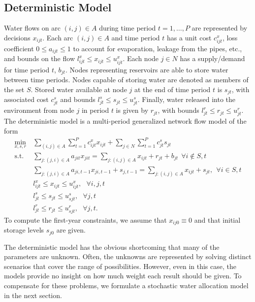 \documentclass[opre,nonblindrev]{informs3} %
\newcommand{\st}{\mbox{s.t.}}
\begin{document}
\subsection{Deterministic Model}

Water flows on arc $(i,j) \in A$ during time period $t = 1, \dots, P$ are represented by decisions $x_{ijt}$.
Each arc $(i,j) \in A$ and time period $t$ has a unit cost $c_{ijt}^x$, loss coefficient $0 \leq a_{ijt} \leq 1$ to account for evaporation, leakage from the pipes, etc., and bounds on the flow $l_{ijt}^x \leq x_{ijt} \leq u_{ijt}^x$.
Each node $j \in N$ has a supply/demand for time period $t$, $b_{jt}$.
Nodes representing reservoirs are able to store water between time periods.
Nodes capable of storing water are denoted as members of the set $S$.
Stored water available at node $j$ at the end of time period $t$ is $s_{jt}$, with associated cost $c_{jt}^s$ and bounds $l_{jt}^s \leq s_{jt} \leq u_{jt}^s$.
Finally, water released into the environment from node $j$ in period $t$ is given by $r_{jt}$, with bounds $l_{jt}^r \leq r_{jt} \leq u_{jt}^r$.
The deterministic model is a multi-period generalized network flow model of the form
\begin{align*}
	\min_{x,s,r} \ & \sum_{(i,j) \in A} \sum_{t=1}^P c_{ijt}^x x_{ijt} + \sum_{j \in N} \sum_{t=1}^P c_{jt}^s s_{jt} \\
	\st \ & \sum_{j : (j,i) \in A} a_{jit} x_{jit} = \sum_{j : (i,j) \in A} x_{ijt} + r_{jt} + b_{jt} \ \ \forall i \not\in S, t \\
	& \sum_{j : (j,i) \in A} a_{ji,t-1} x_{ji,t-1} + s_{j,t-1} = \sum_{j : (i,j) \in A} x_{ijt} + s_{jt}, \ \ \forall i \in S,t \\
	& l_{ijt}^x \leq x_{ijt} \leq u_{ijt}^x,\ \ \ \forall i,j,t \\
	& l_{jt}^s \leq s_{jt} \leq u_{sjt}^s, \ \ \ \forall j,t \\
	& l_{jt}^r \leq r_{jt} \leq u_{sjt}^r, \ \ \ \forall j,t.
\end{align*}
To compute the first-year constraints, we assume that $x_{ij0} \equiv 0$ and that initial storage levels $s_{j0}$ are given.

The deterministic model has the obvious shortcoming that many of the parameters are unknown.
Often, the unknowns are represented by solving distinct scenarios that cover the range of possibilities.
However, even in this case, the models provide no insight on how much weight each result should be given.
To compensate for these problems, we formulate a stochastic water allocation model in the next section.
\end{document}

